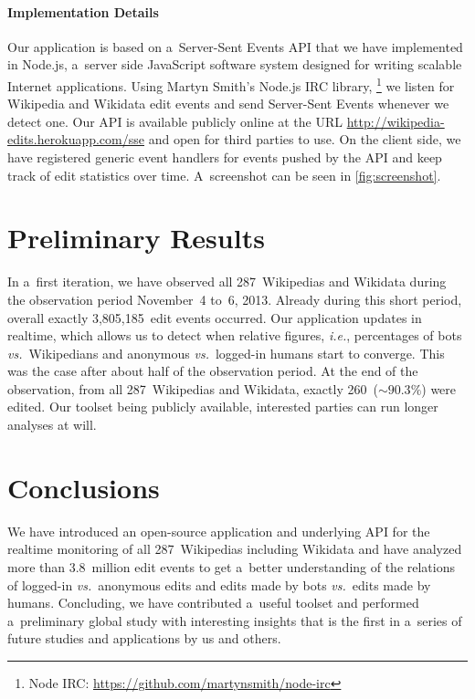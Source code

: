 \documentclass{sig-alternate-2013}
\newcommand{\inlinelistingsize}{\fontsize{8pt}{11pt}}
\let\oldurl\url
\renewcommand{\url}[1]{\inlinelistingsize\oldurl{#1}}
\begin{document}
\paragraph{Implementation Details}

Our application is based on a~Server-Sent Events API
that we have implemented in Node.js,
a~server side JavaScript software system
designed for writing scalable Internet applications.
Using Martyn Smith's Node.js IRC library,%
\footnote{Node IRC:
\url{https://github.com/martynsmith/node-irc}}
we listen for Wikipedia and Wikidata edit events
and send Server-Sent Events whenever we detect one.
Our API is available publicly online
at the URL \url{http://wikipedia-edits.herokuapp.com/sse}
and open for third parties to use.
On the client side, we have registered generic event handlers for events
pushed by the API and keep track of edit statistics over time.
A~screenshot can be seen in \autoref{fig:screenshot}.

\section{Preliminary Results}

In a~first iteration, we have observed all 287~Wikipedias and Wikidata
during the observation period November~4
to~6, 2013.
Already during this short period,
overall exactly 3,805,185~edit events occurred.
Our application updates in realtime,
which allows us to detect when relative figures,
\emph{i.e.}, percentages of bots \emph{vs.}\ Wikipedians
and anonymous \emph{vs.}\ logged-in humans start to converge.
This was the case after about half of the observation period.
At the end of the observation,
from all 287~Wikipedias and Wikidata,
exactly 260~($\sim90.3\%$) were edited.
Our toolset being publicly available,
interested parties can run longer analyses at will.

\section{Conclusions}

We have introduced an open-source application
and underlying API for the realtime monitoring
of all 287~Wiki\-pedias including Wikidata
and have analyzed more than 3.8~million edit events
to get a~better understanding
of the relations of logged-in \emph{vs.}\ anonymous edits
and edits made by bots \emph{vs.}\ edits made by humans.
Concluding, we have contributed a~useful toolset
and performed a~preliminary global study
with interesting insights that
is the first in a~series
of future studies and applications by us and others.



\balancecolumns
\end{document}
